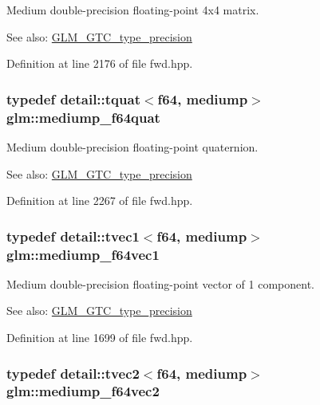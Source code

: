 Medium double-precision floating-point 4x4 matrix. \begin{Desc}
\item[See also:]\hyperlink{group__gtc__type__precision}{GLM\_\-GTC\_\-type\_\-precision} \end{Desc}


Definition at line 2176 of file fwd.hpp.\hypertarget{group__gtc__type__precision_g7cf626acf7f4fc29355c147bfe05163d}{
\subsubsection[mediump\_\-f64quat]{\setlength{\rightskip}{0pt plus 5cm}typedef detail::tquat$<$f64, mediump$>$ {\bf glm::mediump\_\-f64quat}}}
\label{group__gtc__type__precision_g7cf626acf7f4fc29355c147bfe05163d}


Medium double-precision floating-point quaternion. \begin{Desc}
\item[See also:]\hyperlink{group__gtc__type__precision}{GLM\_\-GTC\_\-type\_\-precision} \end{Desc}


Definition at line 2267 of file fwd.hpp.\hypertarget{group__gtc__type__precision_g1e3bbbd9ce5e215c4ba0980264b2711d}{
\subsubsection[mediump\_\-f64vec1]{\setlength{\rightskip}{0pt plus 5cm}typedef detail::tvec1$<$f64, mediump$>$ {\bf glm::mediump\_\-f64vec1}}}
\label{group__gtc__type__precision_g1e3bbbd9ce5e215c4ba0980264b2711d}


Medium double-precision floating-point vector of 1 component. \begin{Desc}
\item[See also:]\hyperlink{group__gtc__type__precision}{GLM\_\-GTC\_\-type\_\-precision} \end{Desc}


Definition at line 1699 of file fwd.hpp.\hypertarget{group__gtc__type__precision_g892891863b8e50195e3e48077a329335}{
\subsubsection[mediump\_\-f64vec2]{\setlength{\rightskip}{0pt plus 5cm}typedef detail::tvec2$<$f64, mediump$>$ {\bf glm::mediump\_\-f64vec2}}}
\label{group__gtc__type__precision_g892891863b8e50195e3e48077a329335}


